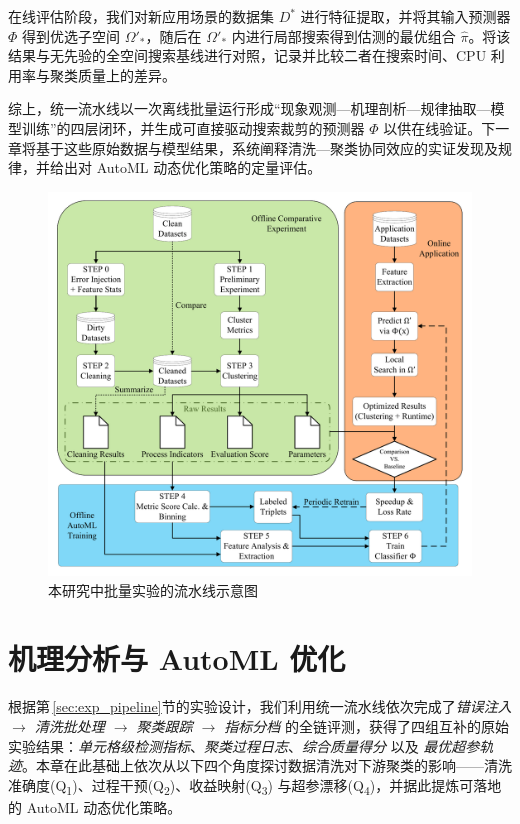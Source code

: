 \documentclass[10pt]{article} %
\numberwithin{equation}{section}
\begin{document}
在线评估阶段，我们对新应用场景的数据集 $D^\ast$ 进行特征提取，并将其输入预测器 $\varPhi$ 得到优选子空间 $\Omega'_\ast$，随后在 $\Omega'_\ast$ 内进行局部搜索得到估测的最优组合 $\hat{\pi}$。将该结果与无先验的全空间搜索基线进行对照，记录并比较二者在搜索时间、CPU 利用率与聚类质量上的差异。 

综上，统一流水线以一次离线批量运行形成“现象观测—机理剖析—规律抽取—模型训练”的四层闭环，并生成可直接驱动搜索裁剪的预测器 \(\varPhi\) 以供在线验证。下一章将基于这些原始数据与模型结果，系统阐释清洗—聚类协同效应的实证发现及规律，并给出对 AutoML 动态优化策略的定量评估。

\begin{figure}[t]
  \centering
  \includegraphics[width=0.95\linewidth]{figures/4graph/flowchart1.pdf}
  \caption{本研究中批量实验的流水线示意图}
  \label{fig:exp_flow}
\end{figure}

\section{机理分析与 AutoML 优化}
\label{sec:chapter6}

\vspace{-0.3em}
\noindent

根据第\,\ref{sec:exp_pipeline}节的实验设计，我们利用统一流水线依次完成了\textit{错误注入 $\rightarrow$ 清洗批处理 $\rightarrow$ 聚类跟踪 $\rightarrow$ 指标分档} 的全链评测，获得了四组互补的原始实验结果：\emph{单元格级检测指标}、\emph{聚类过程日志}、\emph{综合质量得分} 以及 \emph{最优超参轨迹}。本章在此基础上依次从以下四个角度探讨数据清洗对下游聚类的影响——清洗准确度(Q\textsubscript{1})、过程干预(Q\textsubscript{2})、收益映射(Q\textsubscript{3}) 与超参漂移(Q\textsubscript{4})，并据此提炼可落地的 AutoML 动态优化策略。
\end{document}
